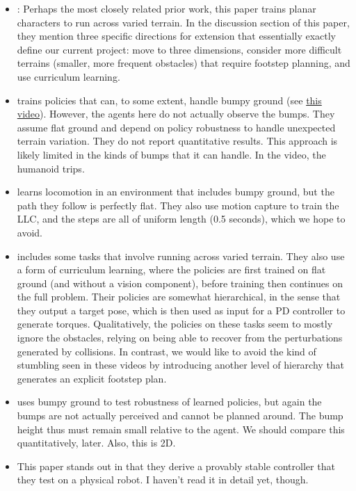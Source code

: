 \documentclass[a4paper]{article}
\newcommand{\highlight}[1]{{\leavevmode\color{blue} #1}}
\begin{document}
\begin{itemize}
  \item \cite{peng2016terrain}: Perhaps the most closely related prior work, this paper trains planar characters to run across varied terrain. In the discussion section of this paper, they mention three specific directions for extension that essentially exactly define our current project: move to three dimensions, consider more difficult terrains (smaller, more frequent obstacles) that require footstep planning, and use curriculum learning.

  \item \cite{heess2017emergence} trains policies that can, to some extent, handle bumpy ground (see \href{https://www.youtube.com/watch?v=hx_bgoTF7bs&feature=youtu.be&t=1m28s}{this video}).
    However, the agents here do not actually observe the bumps.
    They assume flat ground and depend on policy robustness to handle unexpected terrain variation.
    They do not report quantitative results.
    This approach is likely limited in the kinds of bumps that it can handle.
    In the video, the humanoid trips.

  \item \cite{peng2017deeploco}
    learns locomotion in an environment that includes bumpy ground, but the path they follow is perfectly flat.
    They also use motion capture to train the LLC, and the steps are all of uniform length (0.5 seconds), which we hope to avoid.

  \item \cite{peng2018deepmimic} includes some tasks that involve running across varied terrain.
    They also use a form of curriculum learning, where the policies are first trained on flat ground (and without a vision component), before training then continues on the full problem.
    Their policies are somewhat hierarchical, in the sense that they output a target pose, which is then used as input for a PD controller to generate torques.
    Qualitatively, the policies on these tasks seem to mostly ignore the obstacles, relying on being able to recover from the perturbations generated by collisions.
    In contrast, we would like to avoid the kind of stumbling seen in these videos by introducing another level of hierarchy that generates an explicit footstep plan.


  \item \cite{peng2017learning} uses bumpy ground to test robustness of learned policies, but again the bumps are not actually perceived and cannot be planned around. The bump height thus must remain small relative to the agent. \highlight{We should compare this quantitatively, later.} Also, this is 2D.
  \item \cite{manchester2011stable} This paper stands out in that they derive a provably stable controller that they test on a physical robot. \highlight{I haven't read it in detail yet, though.}
\end{itemize}
\end{document}
